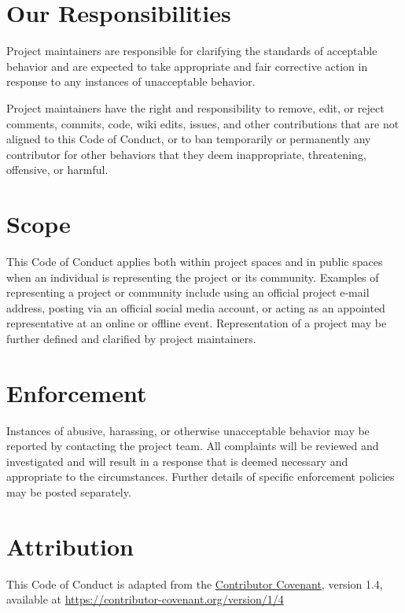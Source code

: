 \documentclass[
  letterpaper,
  oneside,
  open=any]{scrbook}
\begin{document}
\hypertarget{our-responsibilities}{%
\section{Our Responsibilities}\label{our-responsibilities}}

Project maintainers are responsible for clarifying the standards of
acceptable behavior and are expected to take appropriate and fair
corrective action in response to any instances of unacceptable behavior.

Project maintainers have the right and responsibility to remove, edit,
or reject comments, commits, code, wiki edits, issues, and other
contributions that are not aligned to this Code of Conduct, or to ban
temporarily or permanently any contributor for other behaviors that they
deem inappropriate, threatening, offensive, or harmful.

\hypertarget{scope}{%
\section{Scope}\label{scope}}

This Code of Conduct applies both within project spaces and in public
spaces when an individual is representing the project or its community.
Examples of representing a project or community include using an
official project e-mail address, posting via an official social media
account, or acting as an appointed representative at an online or
offline event. Representation of a project may be further defined and
clarified by project maintainers.

\hypertarget{enforcement}{%
\section{Enforcement}\label{enforcement}}

Instances of abusive, harassing, or otherwise unacceptable behavior may
be reported by contacting the project team. All complaints will be
reviewed and investigated and will result in a response that is deemed
necessary and appropriate to the circumstances. Further details of
specific enforcement policies may be posted separately.

\hypertarget{attribution}{%
\section{Attribution}\label{attribution}}

This Code of Conduct is adapted from the
\href{https://contributor-covenant.org}{Contributor Covenant}, version
1.4, available at
\href{https://contributor-covenant.org/version/1/4/}{https://contributor-covenant.org/version/1/4}
\end{document}

